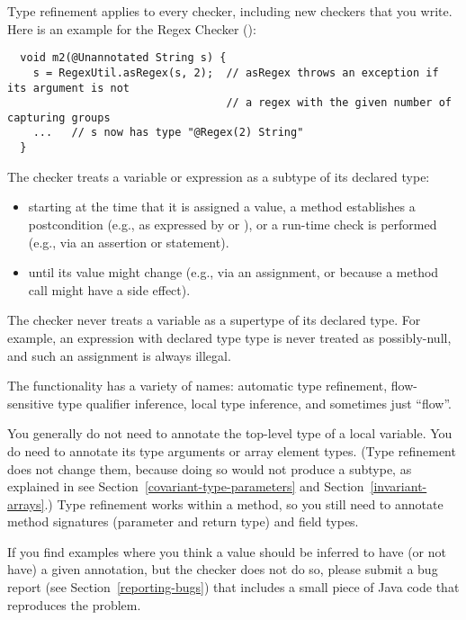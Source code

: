 Type refinement applies to every checker, including new
checkers that you write.  Here is an example for the Regex Checker
():

\begin{Verbatim}
  void m2(@Unannotated String s) {
    s = RegexUtil.asRegex(s, 2);  // asRegex throws an exception if its argument is not
                                  // a regex with the given number of capturing groups
    ...   // s now has type "@Regex(2) String"
  }
\end{Verbatim}



The checker treats a variable or expression as a subtype of its declared type:
\begin{itemize}
\item
  starting at the time that
  it is assigned a value,
  a method establishes a postcondition (e.g., as
  expressed by  or
  ), or
  a run-time check is performed (e.g., via an assertion or
   statement).
\item
until its value might change (e.g.,
via an assignment, or because a method call might have a side effect).
\end{itemize}

The checker never treats a variable as
a supertype of its declared type.  For example, an expression with declared type 
type is never treated as possibly-null, and such an assignment is always illegal.

The functionality has a variety of names:  automatic type refinement,
flow-sensitive type qualifier inference, local type inference, and
sometimes just ``flow''.



You generally do not need to annotate the top-level type of a local variable.
You do need to annotate its type arguments or array element types.
(Type refinement does not change them, because doing so would not produce a
subtype, as explained in see Section~\ref{covariant-type-parameters} and
Section~\ref{invariant-arrays}.)
Type refinement works within a method, so you still need to
annotate method signatures (parameter and return type) and field types.

If you find examples where you think a value should be inferred to have
(or not have) a
given annotation, but the checker does not do so, please submit a bug
report (see Section~\ref{reporting-bugs}) that includes a small piece of
Java code that reproduces the problem.


